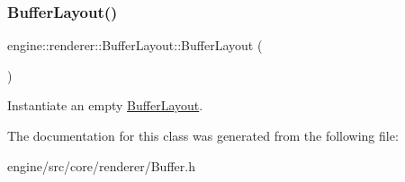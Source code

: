 \subsubsection{\texorpdfstring{Buffer\+Layout()}{BufferLayout()}\hspace{0.1cm}{\footnotesize\ttfamily [2/2]}}
{\footnotesize\ttfamily engine\+::renderer\+::\+Buffer\+Layout\+::\+Buffer\+Layout (\begin{DoxyParamCaption}{ }\end{DoxyParamCaption})\hspace{0.3cm}{\ttfamily [inline]}}

Instantiate an empty \hyperlink{classengine_1_1renderer_1_1BufferLayout}{Buffer\+Layout}. 

The documentation for this class was generated from the following file\+:\begin{DoxyCompactItemize}
\item 
engine/src/core/renderer/Buffer.\+h\end{DoxyCompactItemize}
